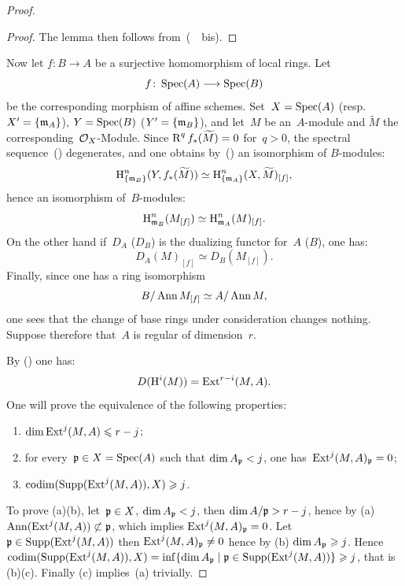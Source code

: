 \begin{proof}
\begin{proof}
The lemma then follows from~(~~\textup{bis}).
\end{proof}

Now let $f\colon B\to A$ be a surjective homomorphism of local rings. Let
\[
f\colon\Spec(A)\to\Spec(B)
\]
be the corresponding morphism of affine schemes. Set~$X=\operatorname{Spec}(A)$ (resp.\ $X^{\prime}=\{\mathfrak{m}_{A}\}$), $Y=\operatorname{Spec}(B)$ (\resp $Y^{\prime}=\{\mathfrak{m}_{B}\}$), and let~$M$ be an~$A$-module and $\widetilde{M}$ the corresponding~$\mathcal{O}_X$-Module. Since $\operatorname{R}^{q}f_{\ast}(\widetilde{M})=0$ for~$q>0$, the spectral sequence~() degenerates, and one obtains by~() an isomorphism of $B$-modules:
\begin{equation} \label{eq:V.18} \operatorname{H}_{\{\mathfrak{m}_{B}\} }^{n}(Y, f_{\ast}(\widetilde{M}))\simeq\operatorname{H}_{\{\mathfrak{m}_{A}\} }^{n}(X, \widetilde{M})_{[f]},
\end{equation}
hence an isomorphism of~$B$-modules:
\begin{equation} \label{eq:V.19} \operatorname{H}_{\mathfrak{m}_{B}}^{n}(M_{[f]})\simeq\operatorname{H}_{\mathfrak{m}_{A}}^{n}(M)_{[f]}.
\end{equation}
On the other hand if~$D_{A}$ (\resp $D_{B}$) is the dualizing functor for~$A$ (\resp $B$), one has:
\begin{equation} \label{eq:V.20} D_{A}(M)_{[f]}\simeq D_{B}(M_{[f]}).
\end{equation}
Finally, since one has a ring isomorphism
\begin{equation} \label{eq:V.21} B/\operatorname{Ann} M_{[f]}\simeq A/\operatorname{Ann} M,
\end{equation}
one sees that the change of base rings under consideration changes nothing. Suppose therefore that~$A$ is regular of dimension~$r$.

By () one has:
\begin{equation} \label{eq:V.22}
D(\operatorname{H}^{i}(M))=\operatorname{Ext}^{r-i}(M, A).
\end{equation}
One will prove the equivalence of the following properties:
\begin{enumerate}
\item[(a)] $\dim \operatorname{Ext}^{j}(M, A)\leqslant r-j$;
\item[(b)] for every~$\mathfrak{p}\in X=\operatorname{Spec}(A)$ such that $\dim A_{\mathfrak{p}}<j$, one has~$\operatorname{Ext}^{j}(M, A)_{\mathfrak{p}}=0$;
\item[(c)] $\operatorname{codim}(\operatorname{Supp}(\operatorname{Ext}^{j}(M, A)), X)\geqslant j$.
\end{enumerate}

To prove (a)\ALORS (b), let~$\mathfrak{p}\in X$, $\dim A_{\mathfrak{p}}<j$, then $\dim A/\mathfrak{p}>r-j$, hence by (a) $\operatorname{Ann}(\operatorname{Ext}^{j}(M, A))\not\subset\mathfrak{p}$, which implies $\operatorname{Ext}^{j}(M, A)_{\mathfrak{p}}=0$. Let~$\mathfrak{p}\in\operatorname{Supp}(\operatorname{Ext}^{j}(M, A))$ then $\operatorname{Ext}^{j}(M, A)_{\mathfrak{p}}\neq 0$ hence by (b) $\dim A_{\mathfrak{p}}\geqslant j$. Hence $\operatorname{codim}(\operatorname{Supp}(\operatorname{Ext}^{j}(M, A)), X)=\inf\{ \dim A_{\mathfrak{p}}\mid \mathfrak{p}\in\operatorname{Supp}(\operatorname{Ext}^{j}(M, A))\} \geqslant j$, that is (b)\ALORS (c). Finally (c) implies~(a) trivially.


\end{proof}

